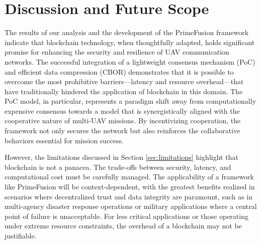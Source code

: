 \section{Discussion and Future Scope}
\label{sec:discussion}

The results of our analysis and the development of the PrimeFusion framework indicate that blockchain technology, when thoughtfully adapted, holds significant promise for enhancing the security and resilience of UAV communication networks. The successful integration of a lightweight consensus mechanism (PoC) and efficient data compression (CBOR) demonstrates that it is possible to overcome the most prohibitive barriers—latency and resource overhead—that have traditionally hindered the application of blockchain in this domain. The PoC model, in particular, represents a paradigm shift away from computationally expensive consensus towards a model that is synergistically aligned with the cooperative nature of multi-UAV missions. By incentivizing cooperation, the framework not only secures the network but also reinforces the collaborative behaviors essential for mission success.

However, the limitations discussed in Section \ref{sec:limitations} highlight that blockchain is not a panacea. The trade-offs between security, latency, and computational cost must be carefully managed. The applicability of a framework like PrimeFusion will be context-dependent, with the greatest benefits realized in scenarios where decentralized trust and data integrity are paramount, such as in multi-agency disaster response operations or military applications where a central point of failure is unacceptable. For less critical applications or those operating under extreme resource constraints, the overhead of a blockchain may not be justifiable.

